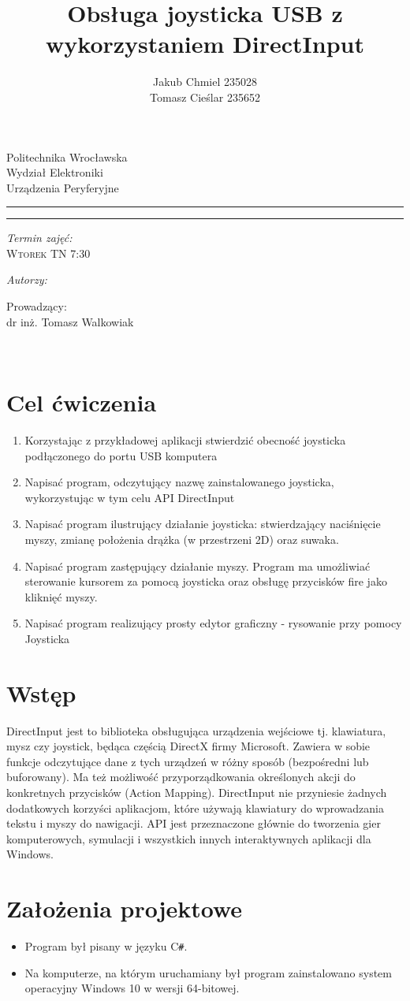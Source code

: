 \documentclass[12pt,a4paper,notitlepage]{report}
\author{ Jakub Chmiel  235028 \\ Tomasz Cieślar 235652}
\title{Obsługa joysticka USB z wykorzystaniem DirectInput}
\makeatletter
\newcommand{\linia}{\rule{\linewidth}{0.4mm}}
\renewcommand{\maketitle}{\begin{titlepage}
    \vspace*{1cm}
    \begin{center}\small
    Politechnika Wrocławska\\
    Wydział Elektroniki\\
    Urządzenia Peryferyjne 
    \end{center}
    \vspace{4.5cm}
    \noindent\linia
    \begin{center}
      \LARGE \textsc{\@title}
         \end{center}
     \linia
    \vspace{0.5cm}
    \begin{flushright}
    \begin{minipage}{6cm}
    
     \vspace{4cm}
     \textit{\small Termin zajęć:}\\
     \normalsize \textsc{Wtorek TN 7:30} \par
	\vspace{0.3cm}    
    \textit{\small Autorzy:}\\
    \normalsize \textsc{\@author} \par
     \vspace{0.3cm}
        Prowadzący: \\ dr inż. Tomasz Walkowiak

    \end{minipage}
    \vspace{1cm}
     {\small }\\
       
     \end{flushright}
    \vspace*{\stretch{3}}
    \begin{center}
    \@date
    \end{center}
  \end{titlepage}%
}
\makeatother
\begin{document}
\maketitle

\newpage
\tableofcontents
\newpage
\renewcommand*\thesection{\arabic{section}}
\section{Cel ćwiczenia}
\begin{enumerate}
\item Korzystając z przykładowej aplikacji stwierdzić obecność joysticka podłączonego do portu USB komputera 
\item Napisać program, odczytujący nazwę zainstalowanego joysticka, wykorzystując w tym celu API DirectInput
\item Napisać program ilustrujący działanie joysticka: stwierdzający naciśnięcie myszy, zmianę położenia drążka (w przestrzeni 2D) oraz suwaka.
\item Napisać program zastępujący działanie myszy. Program ma umożliwiać sterowanie kursorem za pomocą joysticka oraz obsługę przycisków fire jako kliknięć myszy.
\item Napisać program realizujący prosty edytor graficzny - rysowanie przy pomocy Joysticka
\end{enumerate}

\section{Wstęp}
DirectInput jest to biblioteka obsługująca urządzenia wejściowe tj. klawiatura, mysz czy joystick, będąca częścią DirectX firmy Microsoft. Zawiera w sobie funkcje odczytujące dane z tych urządzeń w różny sposób (bezpośredni lub buforowany). Ma też możliwość przyporządkowania określonych akcji do konkretnych przycisków (Action Mapping). DirectInput nie przyniesie żadnych dodatkowych korzyści aplikacjom, które używają klawiatury do wprowadzania tekstu i myszy do nawigacji. API jest przeznaczone głównie do tworzenia gier komputerowych, symulacji i wszystkich innych interaktywnych aplikacji dla Windows.
\section{Założenia projektowe}
\begin{itemize}
\item Program był pisany w języku C\texttt{\#}.
\item Na komputerze, na którym uruchamiany był program zainstalowano system operacyjny Windows 10 w wersji 64-bitowej.
\end{itemize}
\end{document}
